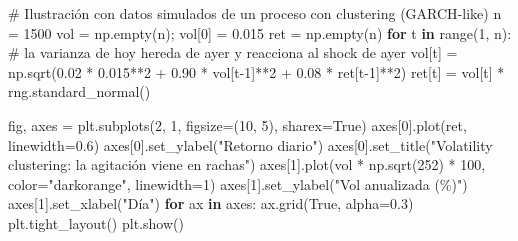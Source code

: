 \documentclass[
  spanish,
  letterpaper,
  DIV=11,
  numbers=noendperiod]{scrreprt}
\newenvironment{Shaded}{\begin{snugshade}}{\end{snugshade}}
\newcommand{\BuiltInTok}[1]{\textcolor[rgb]{0.00,0.23,0.31}{#1}}
\newcommand{\CommentTok}[1]{\textcolor[rgb]{0.37,0.37,0.37}{#1}}
\newcommand{\ControlFlowTok}[1]{\textcolor[rgb]{0.00,0.23,0.31}{\textbf{#1}}}
\newcommand{\DecValTok}[1]{\textcolor[rgb]{0.68,0.00,0.00}{#1}}
\newcommand{\FloatTok}[1]{\textcolor[rgb]{0.68,0.00,0.00}{#1}}
\newcommand{\KeywordTok}[1]{\textcolor[rgb]{0.00,0.23,0.31}{\textbf{#1}}}
\newcommand{\NormalTok}[1]{\textcolor[rgb]{0.00,0.23,0.31}{#1}}
\newcommand{\OperatorTok}[1]{\textcolor[rgb]{0.37,0.37,0.37}{#1}}
\newcommand{\StringTok}[1]{\textcolor[rgb]{0.13,0.47,0.30}{#1}}
\newcommand{\VariableTok}[1]{\textcolor[rgb]{0.07,0.07,0.07}{#1}}
\begin{document}
\begin{Shaded}
\begin{Highlighting}[]
\CommentTok{\# Ilustración con datos simulados de un proceso con clustering (GARCH{-}like)}
\NormalTok{n }\OperatorTok{=} \DecValTok{1500}
\NormalTok{vol }\OperatorTok{=}\NormalTok{ np.empty(n)}\OperatorTok{;}\NormalTok{ vol[}\DecValTok{0}\NormalTok{] }\OperatorTok{=} \FloatTok{0.015}
\NormalTok{ret }\OperatorTok{=}\NormalTok{ np.empty(n)}
\ControlFlowTok{for}\NormalTok{ t }\KeywordTok{in} \BuiltInTok{range}\NormalTok{(}\DecValTok{1}\NormalTok{, n):}
    \CommentTok{\# la varianza de hoy hereda de ayer y reacciona al shock de ayer}
\NormalTok{    vol[t] }\OperatorTok{=}\NormalTok{ np.sqrt(}\FloatTok{0.02} \OperatorTok{*} \FloatTok{0.015}\OperatorTok{**}\DecValTok{2} \OperatorTok{+} \FloatTok{0.90} \OperatorTok{*}\NormalTok{ vol[t}\OperatorTok{{-}}\DecValTok{1}\NormalTok{]}\OperatorTok{**}\DecValTok{2} \OperatorTok{+} \FloatTok{0.08} \OperatorTok{*}\NormalTok{ ret[t}\OperatorTok{{-}}\DecValTok{1}\NormalTok{]}\OperatorTok{**}\DecValTok{2}\NormalTok{)}
\NormalTok{    ret[t] }\OperatorTok{=}\NormalTok{ vol[t] }\OperatorTok{*}\NormalTok{ rng.standard\_normal()}

\NormalTok{fig, axes }\OperatorTok{=}\NormalTok{ plt.subplots(}\DecValTok{2}\NormalTok{, }\DecValTok{1}\NormalTok{, figsize}\OperatorTok{=}\NormalTok{(}\DecValTok{10}\NormalTok{, }\DecValTok{5}\NormalTok{), sharex}\OperatorTok{=}\VariableTok{True}\NormalTok{)}
\NormalTok{axes[}\DecValTok{0}\NormalTok{].plot(ret, linewidth}\OperatorTok{=}\FloatTok{0.6}\NormalTok{)}
\NormalTok{axes[}\DecValTok{0}\NormalTok{].set\_ylabel(}\StringTok{"Retorno diario"}\NormalTok{)}
\NormalTok{axes[}\DecValTok{0}\NormalTok{].set\_title(}\StringTok{"Volatility clustering: la agitación viene en rachas"}\NormalTok{)}
\NormalTok{axes[}\DecValTok{1}\NormalTok{].plot(vol }\OperatorTok{*}\NormalTok{ np.sqrt(}\DecValTok{252}\NormalTok{) }\OperatorTok{*} \DecValTok{100}\NormalTok{, color}\OperatorTok{=}\StringTok{"darkorange"}\NormalTok{, linewidth}\OperatorTok{=}\DecValTok{1}\NormalTok{)}
\NormalTok{axes[}\DecValTok{1}\NormalTok{].set\_ylabel(}\StringTok{"Vol anualizada (\%)"}\NormalTok{)}
\NormalTok{axes[}\DecValTok{1}\NormalTok{].set\_xlabel(}\StringTok{"Día"}\NormalTok{)}
\ControlFlowTok{for}\NormalTok{ ax }\KeywordTok{in}\NormalTok{ axes:}
\NormalTok{    ax.grid(}\VariableTok{True}\NormalTok{, alpha}\OperatorTok{=}\FloatTok{0.3}\NormalTok{)}
\NormalTok{plt.tight\_layout()}
\NormalTok{plt.show()}
\end{Highlighting}
\end{Shaded}
\end{document}
